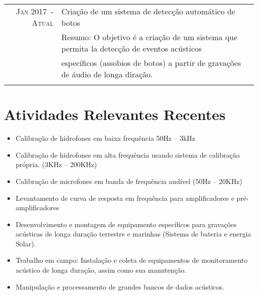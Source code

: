 \documentclass[a4paper,10pt]{article}
\begin{document}
\begin{tabular}{rl}
    \textsc{Jan 2017~-~Atual}   & Criação de um sistema de detecção automático de botos\\
                                &\footnotesize{Resumo: O objetivo é a criação de um sistema que permita la detecção de eventos acústicos} \\ 
                                &\footnotesize{específicos (assobios de botos) a partir de gravações de áudio de longa diração.} \\
                                &\\

\end{tabular}

\newpage

\section{Atividades Relevantes Recentes}

\begin{itemize}
    \item Calibração de hidrofones em baixa frequência 50Hz – 3kHz
    \item Calibração de hidrofones em alta frequência usando sistema de calibração própria. (3KHz – 200KHz)
    \item Calibração de microfones em banda de frequência audível (50Hz – 20KHz)
    \item Levantamento de curva de resposta em frequência para amplificadores e pré-amplificadores
    \item Desenvolvimento e montagem de equipamento específicos para gravações acústicas de longa duração terrestre e marinhas (Sistema de bateria e energia Solar).
    \item Trabalho em campo: Instalação e coleta de equipamentos de monitoramento acústico de longa duração, assim como sua manutenção.
    \item Manipulação e processamento de grandes bancos de dados acústicos.
\end{itemize}

\end{document}
